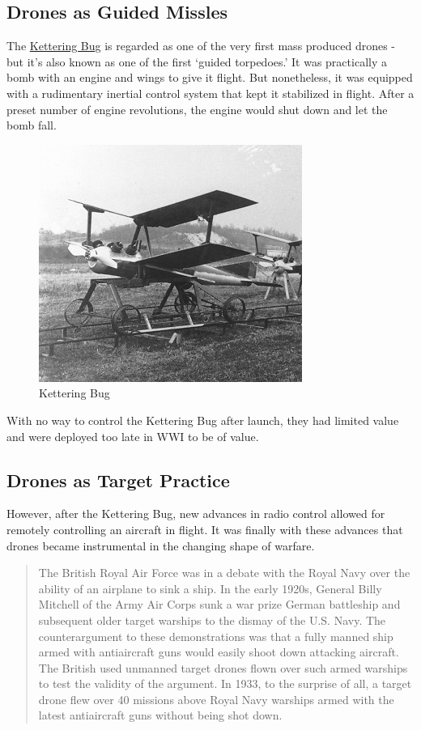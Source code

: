 \documentclass[
]{book}
\theoremstyle{definition}
\theoremstyle{definition}
\theoremstyle{definition}
\theoremstyle{remark}
\begin{document}
\hypertarget{drones-as-guided-missles}{%
\subsection{Drones as Guided Missles}\label{drones-as-guided-missles}}

The \href{https://en.wikipedia.org/wiki/Kettering_Bug}{Kettering Bug} is regarded as one of the very first mass produced drones - but it's also known as one of the first `guided torpedoes.' It was practically a bomb with an engine and wings to give it flight. But nonetheless, it was equipped with a rudimentary inertial control system that kept it stabilized in flight. After a preset number of engine revolutions, the engine would shut down and let the bomb fall.

\begin{figure}

{\centering \includegraphics[width=0.5\linewidth]{images/history/Kettering_Bug} 

}

\caption{Kettering Bug}\label{fig:kbug}
\end{figure}

With no way to control the Kettering Bug after launch, they had limited value and were deployed too late in WWI to be of value.

\hypertarget{drones-as-target-practice}{%
\subsection{Drones as Target Practice}\label{drones-as-target-practice}}

However, after the Kettering Bug, new advances in radio control allowed for remotely controlling an aircraft in flight. It was finally with these advances that drones became instrumental in the changing shape of warfare.

\begin{quote}
The British Royal Air Force was in a debate with the Royal Navy over the ability of an airplane to sink a ship. In the early 1920s, General Billy Mitchell of the Army Air Corps sunk a war prize German battleship and subsequent older target warships to the dismay of the U.S. Navy. The counterargument to these demonstrations was that a fully manned ship armed with antiaircraft guns would easily shoot down attacking aircraft. The British used unmanned target drones flown over such armed warships to test the validity of the argument. In 1933, to the surprise of all, a target drone flew over 40 missions above Royal Navy warships armed with the latest antiaircraft guns without being shot down.
\end{quote}
\end{document}
